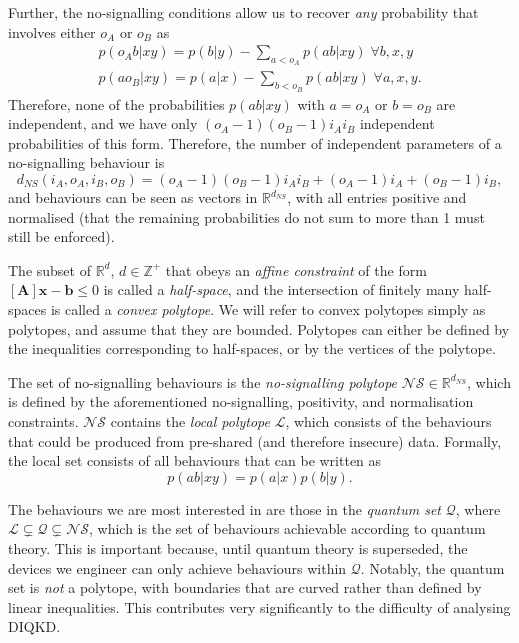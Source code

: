 \documentclass[10pt, a4paper]{article}
\numberwithin{equation}{section} %
\theoremstyle{definition}
\theoremstyle{plain}
\newcommand{\?}{\mathrel{?}} %
\newcommand{\Z}{\mathbb{Z}} %
\newcommand{\R}{\mathbb{R}} %
\newcommand{\cvec}[1]{\boldsymbol{\mathbf{#1}}}    %
\newcommand{\matr}[1]{\left[\mathbf{#1}\right]} %
\newcommand{\Ls}{\mathcal{L}}
\newcommand{\Qs}{\mathcal{Q}}
\newcommand{\NSs}{\mathcal{NS}}
\begin{document}
  Further, the no-signalling conditions allow us to recover \emph{any} probability that involves either \(o_A\) or \(o_B\) as
  \begin{gather*}
    p(o_A b|xy) = p(b|y) - \sum_{a < o_A} p(ab|xy)\;\forall b,x,y \\
    p(ao_B|xy) = p(a|x) - \sum_{b < o_B} p(ab|xy)\;\forall a,x,y.
  \end{gather*}
  Therefore, none of the probabilities \(p(ab|xy)\) with \(a = o_A\) or \(b = o_B\) are independent, and we have only \((o_A-1)(o_B-1){i_A}{i_B}\) independent probabilities of this form. Therefore, the number of independent parameters of a no-signalling behaviour is
  \[ d_{NS}(i_A, o_A, i_B, o_B) = (o_A-1)(o_B-1){i_A}{i_B} + (o_A-1)i_A + (o_B-1)i_B, \]
  and behaviours can be seen as vectors in \(\R^{d_{NS}}\), with all entries positive and normalised (that the remaining probabilities do not sum to more than 1 must still be enforced).

  The subset of \(\R^d\), \(d \in \Z^+\) that obeys an \emph{affine constraint} of the form \(\matr{A}\cvec{x} - \cvec{b} \leq 0\) is called a \emph{half-space}, and the intersection of finitely many half-spaces is called a \emph{convex polytope}. We will refer to convex polytopes simply as polytopes, and assume that they are bounded. Polytopes can either be defined by the inequalities corresponding to half-spaces, or by the vertices of the polytope.

  The set of no-signalling behaviours is the \emph{no-signalling polytope} \(\NSs \in \R^{d_{NS}}\), which is defined by the aforementioned no-signalling, positivity, and normalisation constraints. \(\NSs\) contains the \emph{local polytope} \(\Ls\), which consists of the behaviours that could be produced from pre-shared (and therefore insecure) data. Formally, the local set consists of all behaviours that can be written as 
  \begin{equation}\label{eqn:localdef}
    p(ab|xy) = p(a|x)p(b|y).
  \end{equation}

  The behaviours we are most interested in are those in the \emph{quantum set} \(\Qs\), where \(\Ls \subsetneq \Qs \subsetneq \NSs\), which is the set of behaviours achievable according to quantum theory. This is important because, until quantum theory is superseded, the devices we engineer can only achieve behaviours within \(\Qs\). Notably, the quantum set is \emph{not} a polytope, with boundaries that are curved rather than defined by linear inequalities. This contributes very significantly to the difficulty of analysing DIQKD.\@
\end{document}
